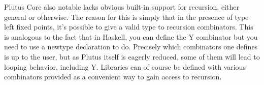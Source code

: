 \documentclass[conference]{IEEEtran}
\begin{document}
Plutus Core also notable lacks obvious built-in support for recursion,
either general or otherwise. The reason for this is simply that in
the presence of type left fixed points, it's possible to give a valid
type to recursion combinators. This is analogous to the fact that in
Haskell, you can define the Y combinator but you need to use a newtype
declaration to do. Precisely which combinators one defines is up to
the user, but as Plutus itself is eagerly reduced, some of them will
lead to looping behavior, including Y. Libraries can of course
be defined with various combinators provided as a convenient way to
gain access to recursion.


\end{document}
